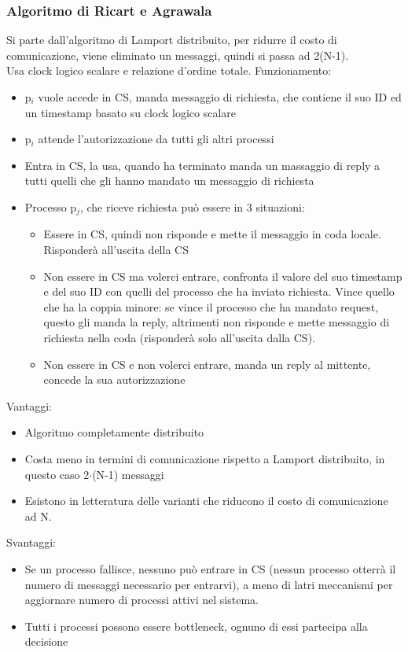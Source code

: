 \documentclass[16px]{article}
\begin{document}
\subsubsection{Algoritmo di Ricart e Agrawala}
Si parte dall'algoritmo di Lamport distribuito, per ridurre il costo di comunicazione, viene eliminato un messaggi, quindi si passa ad 2(N-1).\\ Usa clock logico scalare e relazione d'ordine totale. Funzionamento:
\begin{itemize}
\item p$_i$ vuole accede in CS, manda messaggio di richiesta, che contiene il suo ID ed un timestamp basato su clock logico scalare
\item p$_i$ attende l'autorizzazione da tutti gli altri processi
\item Entra in CS, la usa, quando ha terminato manda un massaggio di reply a tutti quelli che gli hanno mandato un messaggio di richiesta
\item Processo p$_j$, che riceve richiesta può essere in 3 situazioni:
\begin{itemize}
\item Essere in CS, quindi non risponde e mette il messaggio in coda locale. Risponderà all'uscita della CS
\item Non essere in CS ma volerci entrare, confronta il valore del suo timestamp e del suo ID con quelli del processo che ha inviato richiesta. Vince quello che ha la coppia minore: se vince il processo che ha mandato request, questo gli manda la reply, altrimenti non risponde e mette messaggio di richiesta nella coda (risponderà solo all'uscita dalla CS).
\item Non essere in CS e non volerci entrare, manda un reply al mittente, concede la sua autorizzazione
\end{itemize}
\end{itemize}
Vantaggi:
\begin{itemize}
\item Algoritmo completamente distribuito
\item Costa meno in termini di comunicazione rispetto a Lamport distribuito, in questo caso 2$\cdot$(N-1) messaggi
\item Esistono in letteratura delle varianti che riducono il costo di comunicazione ad N.
\end{itemize}
Svantaggi:
\begin{itemize}
\item Se un processo fallisce, nessuno può entrare in CS (nessun processo otterrà il numero di messaggi necessario per entrarvi), a meno di latri meccanismi per aggiornare numero di processi attivi nel sistema.
\item Tutti i processi possono essere bottleneck, ognuno di essi partecipa alla decisione
\end{itemize}
\end{document}
